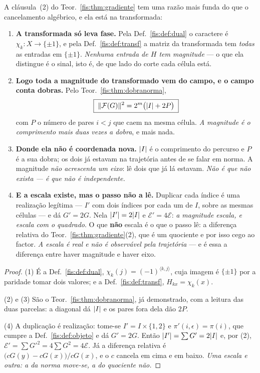 \documentclass[livro.tex]{subfiles}
\begin{document}
\begin{teorema}\label{fis:thm:magnitude}
A cláusula~(2) do Teor.~\ref{fis:thm:gradiente} tem uma razão mais funda do que o
cancelamento algébrico, e ela está na transformada:
\begin{enumerate}\itemsep3pt
\item[(1)] \textbf{A transformada só leva fase.} Pela Def.~\ref{fis:def:dual} o
caractere é $\chi_k\colon X\to\{\pm1\}$, e pela Def.~\ref{fis:def:transf} a matriz
da transformada tem \emph{todas} as entradas em $\{\pm1\}$. \emph{Nenhuma entrada
de $H$ tem magnitude} --- o que ela distingue é o sinal, isto é, de que lado do
corte cada célula está.
\item[(2)] \textbf{Logo toda a magnitude do transformado vem do campo, e o campo
conta dobras.} Pelo Teor.~\ref{fis:thm:dobranorma},
\[
\boxed{\;\lVert\mathcal{F}(G)\rVert^{2}=2^{m}\bigl(\lvert I\rvert+2P\bigr)\;}
\]
com $P$ o número de pares $i<j$ que caem na mesma célula. \emph{A magnitude é o
comprimento mais duas vezes a dobra}, e mais nada.
\item[(3)] \textbf{Donde ela não é coordenada nova.} $\lvert I\rvert$ é o comprimento do
percurso e $P$ é a sua dobra; os dois já estavam na trajetória antes de se falar
em norma. A magnitude \emph{não acrescenta um eixo}: lê dois que já lá estavam.
\emph{Não é que não exista --- é que não é independente.}
\item[(4)] \textbf{E a escala existe, mas o passo não a lê.} Duplicar cada índice
é uma realização legítima --- $I'$ com dois índices por cada um de $I$, sobre as
mesmas células --- e dá $G'=2G$. Nela $\lvert I'\rvert=2\lvert I\rvert$ e $\mathcal{E}'=4\mathcal{E}$:
\emph{a magnitude escala, e escala com o quadrado}. O que \textbf{não} escala é o
que o passo lê: a diferença relativa do Teor.~\ref{fis:thm:gradiente}(2), que é
um quociente e por isso cego ao factor. \emph{A escala é real e não é
observável pela trajetória} --- e é essa a diferença entre haver magnitude e
haver eixo.
\end{enumerate}
\end{teorema}

\begin{proof}
(1) É a Def.~\ref{fis:def:dual}, $\chi_k(j)=(-1)^{\langle k,j\rangle}$, cuja
imagem é $\{\pm1\}$ por a paridade tomar dois valores; e a
Def.~\ref{fis:def:transf}, $H_{kx}=\chi_k(x)$.

(2) e (3) São o Teor.~\ref{fis:thm:dobranorma}, já demonstrado, com a leitura das
duas parcelas: a diagonal dá $\lvert I\rvert$ e os pares fora dela dão $2P$.

(4) A duplicação é realização: tome-se $I'=I\times\{1,2\}$ e $\pi'(i,\epsilon)=\pi(i)$,
que cumpre a Def.~\ref{fis:def:objeto} e dá $G'=2G$. Então $\lvert I'\rvert=\sum G'=2\lvert I\rvert$
e, por (2), $\mathcal{E}'=\sum G'^{2}=4\sum G^{2}=4\mathcal{E}$. Já a diferença
relativa é $\bigl(cG(y)-cG(x)\bigr)/cG(x)$, e o $c$ cancela em cima e em baixo.
\emph{Uma escala e outra: a da norma move-se, a do quociente não.}
\end{proof}
\end{document}
